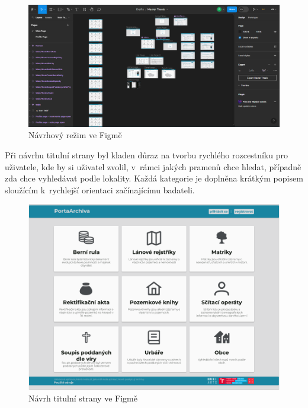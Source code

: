 
\begin{figure}[htbp]
\centering
    \includegraphics[scale=.3]{obrazky-figures/design/figma/project_overview.png}
    \caption{Návrhový režim ve Figmě}
\end{figure}
\noindent
Při návrhu titulní strany byl kladen důraz na tvorbu rychlého rozcestníku pro uživatele, kde by si uživatel zvolil, v~rámci jakých pramenů chce hledat, případně zda chce vyhledávat podle lokality. Každá kategorie je doplněna krátkým popisem sloužícím k~rychlejší orientaci začínajícímu badateli.

\begin{figure}[htbp]
\centering
    \includegraphics[scale=.4]{obrazky-figures/design/figma/Main.png}
    \caption{Návrh titulní strany ve Figmě}
\end{figure}

